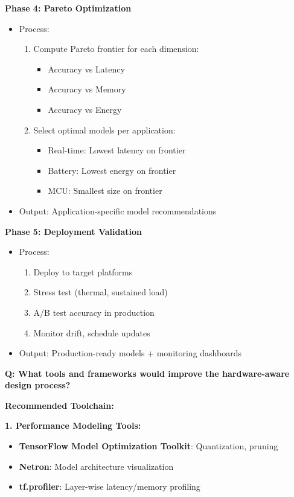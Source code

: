 \documentclass[10pt, a4paper]{article}
\begin{document}
\textbf{Phase 4: Pareto Optimization}
\begin{itemize}
    \item Process:
    \begin{enumerate}
        \item Compute Pareto frontier for each dimension:
        \begin{itemize}
            \item Accuracy vs Latency
            \item Accuracy vs Memory
            \item Accuracy vs Energy
        \end{itemize}
        \item Select optimal models per application:
        \begin{itemize}
            \item Real-time: Lowest latency on frontier
            \item Battery: Lowest energy on frontier
            \item MCU: Smallest size on frontier
        \end{itemize}
    \end{enumerate}
    \item Output: Application-specific model recommendations
\end{itemize}

\textbf{Phase 5: Deployment Validation}
\begin{itemize}
    \item Process:
    \begin{enumerate}
        \item Deploy to target platforms
        \item Stress test (thermal, sustained load)
        \item A/B test accuracy in production
        \item Monitor drift, schedule updates
    \end{enumerate}
    \item Output: Production-ready models + monitoring dashboards
\end{itemize}

\textbf{Q: What tools and frameworks would improve the hardware-aware design process?}

\textbf{Recommended Toolchain:}

\textbf{1. Performance Modeling Tools:}
\begin{itemize}
    \item \textbf{TensorFlow Model Optimization Toolkit}: Quantization, pruning
    \item \textbf{Netron}: Model architecture visualization
    \item \textbf{tf.profiler}: Layer-wise latency/memory profiling
\end{itemize}
\end{document}
